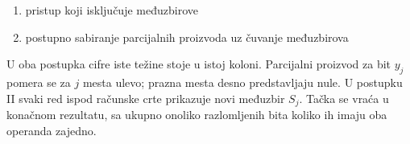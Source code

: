 \documentclass[a4paper,11pt]{article}
\numberwithin{equation}{section}
\begin{document}
\begin{enumerate}[label=\Roman*),start=1,leftmargin=*]
\item pristup koji isključuje međuzbirove

\item postupno sabiranje parcijalnih proizvoda uz čuvanje međuzbirova

\end{enumerate}


U oba postupka cifre iste težine stoje u istoj koloni. Parcijalni proizvod za bit $y_j$ pomera se za $j$ mesta ulevo; prazna mesta desno predstavljaju nule.
U postupku II svaki red ispod računske crte prikazuje novi međuzbir $S_j$.
Tačka se vraća u konačnom rezultatu, sa ukupno onoliko razlomljenih bita koliko ih imaju oba operanda zajedno.\par
\end{document}
